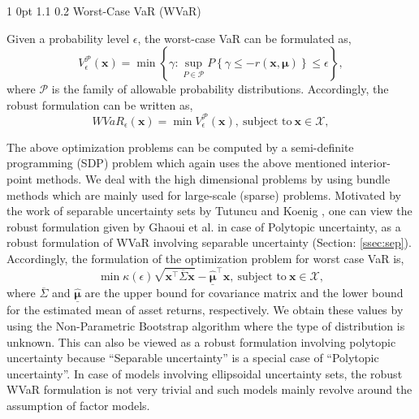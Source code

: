\documentclass[12pt]{article}
\makeatletter
\numberwithin{equation}{section}
\renewcommand{\subsection}{
  \@startsection
  {subsection}%
  {1}%
  {0pt}%
  {1.1\baselineskip}%
  {0.2\baselineskip}%
  {\sc \centering}%
}
\makeatother
\begin{document}
\subsection{Worst-Case VaR (WVaR)}

Given a probability level $\epsilon$, the worst-case VaR can be formulated as,
\begin{equation}
V_{\epsilon}^{\mathcal{P}}(\mathbf{x})=\min\left\{\gamma: \sup_{P \in \mathcal{P}} P\left\{\gamma \leq -r(\mathbf{x},\boldsymbol{\mu})\right\}
\leq \epsilon \right\},
\label{fig:wc_var_basic}
\end{equation}
where $\mathcal{P}$ is the family of allowable probability distributions. Accordingly, the robust formulation can be written as,
\begin{equation}
WVaR_{\epsilon}(\mathbf{x})=\min V_{\epsilon}^{\mathcal{P}}(\mathbf{x}),~\text{subject to}~\mathbf{x} \in \mathcal{X},
\label{fig:wc_var_general}
\end{equation}

The above optimization problems can be computed by a semi-definite programming (SDP) problem which again uses the above mentioned interior-point methods.
We deal with the high dimensional problems by using bundle methods which are mainly used for large-scale (sparse) problems.
Motivated by the work of separable uncertainty sets by Tutuncu and Koenig \cite{tutuncu}, one can view the robust formulation given by Ghaoui et al. \cite{ghaoui03} in case of Polytopic uncertainty, as a robust formulation of WVaR involving separable uncertainty (Section: \ref{ssec:sep}).
Accordingly, the formulation of the optimization problem for worst case VaR is,
\begin{equation}
\min \kappa(\epsilon)\sqrt{\mathbf{x}^{\top}\overline{\Sigma}\mathbf{x}}-\underline{\hat{\boldsymbol{\mu}}}^{\top}\mathbf{x},~\text{subject to}~
\mathbf{x} \in \mathcal{X},
\label{fig:var_poly}
\end{equation}
where $\overline{\Sigma}$ and $\underline{\hat{\boldsymbol{\mu}}}$ are the upper bound for covariance matrix and the lower bound for the
estimated mean of asset returns, respectively. We obtain these values by using the Non-Parametric Bootstrap algorithm where the type of distribution is unknown. This can also be viewed as a robust formulation involving polytopic uncertainty because ``Separable uncertainty'' is a special case of ``Polytopic uncertainty''. In case of models involving ellipsoidal uncertainty sets, the robust WVaR formulation is not very trivial and such models mainly revolve around the
assumption of factor models.
\end{document}
